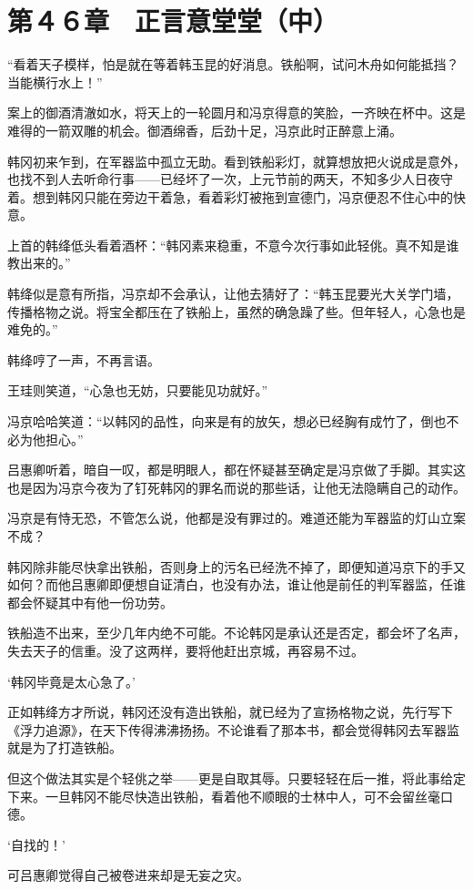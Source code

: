 \section{第４６章　正言意堂堂（中）}

“看着天子模样，怕是就在等着韩玉昆的好消息。铁船啊，试问木舟如何能抵挡？当能横行水上！”

案上的御酒清澈如水，将天上的一轮圆月和冯京得意的笑脸，一齐映在杯中。这是难得的一箭双雕的机会。御酒绵香，后劲十足，冯京此时正醉意上涌。

韩冈初来乍到，在军器监中孤立无助。看到铁船彩灯，就算想放把火说成是意外，也找不到人去听命行事——已经坏了一次，上元节前的两天，不知多少人日夜守着。想到韩冈只能在旁边干着急，看着彩灯被拖到宣德门，冯京便忍不住心中的快意。

上首的韩绛低头看着酒杯：“韩冈素来稳重，不意今次行事如此轻佻。真不知是谁教出来的。”

韩绛似是意有所指，冯京却不会承认，让他去猜好了：“韩玉昆要光大关学门墙，传播格物之说。将宝全都压在了铁船上，虽然的确急躁了些。但年轻人，心急也是难免的。”

韩绛哼了一声，不再言语。

王珪则笑道，“心急也无妨，只要能见功就好。”

冯京哈哈笑道：“以韩冈的品性，向来是有的放矢，想必已经胸有成竹了，倒也不必为他担心。”

吕惠卿听着，暗自一叹，都是明眼人，都在怀疑甚至确定是冯京做了手脚。其实这也是因为冯京今夜为了钉死韩冈的罪名而说的那些话，让他无法隐瞒自己的动作。

冯京是有恃无恐，不管怎么说，他都是没有罪过的。难道还能为军器监的灯山立案不成？

韩冈除非能尽快拿出铁船，否则身上的污名已经洗不掉了，即便知道冯京下的手又如何？而他吕惠卿即便想自证清白，也没有办法，谁让他是前任的判军器监，任谁都会怀疑其中有他一份功劳。

铁船造不出来，至少几年内绝不可能。不论韩冈是承认还是否定，都会坏了名声，失去天子的信重。没了这两样，要将他赶出京城，再容易不过。

‘韩冈毕竟是太心急了。’

正如韩绛方才所说，韩冈还没有造出铁船，就已经为了宣扬格物之说，先行写下《浮力追源》，在天下传得沸沸扬扬。不论谁看了那本书，都会觉得韩冈去军器监就是为了打造铁船。

但这个做法其实是个轻佻之举——更是自取其辱。只要轻轻在后一推，将此事给定下来。一旦韩冈不能尽快造出铁船，看着他不顺眼的士林中人，可不会留丝毫口德。

‘自找的！’

可吕惠卿觉得自己被卷进来却是无妄之灾。

